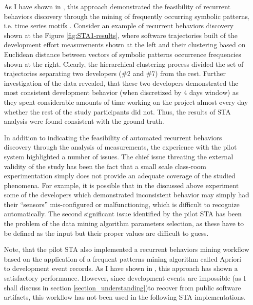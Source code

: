 As I have shown in \cite{csdl2-10-09}, this approach demonstrated the feasibility of recurrent behaviors discovery 
through the mining of frequently occurring symbolic patterns, i.e. time series motifs \cite{sax}. 
Consider an example of recurrent behaviors discovery shown at the Figure \ref{fig:STA1-results}, where software 
trajectories built of the development effort measurements shown at the left and their clustering based on Euclidean 
distance between vectors of symbolic patterns occurrence frequencies shown at the right. Clearly, the hierarchical clustering 
process divided the set of trajectories separating two developers (\#2 and \#7) from the rest. 
Further investigation of the data revealed, that these two developers demonstrated the most consistent development 
behavior (when discretized by 4 days window) as they spent considerable amounts of time working on the project almost every 
day whether the rest of the study participants did not. 
Thus, the results of STA analysis were found consistent with the ground truth.

In addition to indicating the feasibility of automated recurrent behaviors discovery through the analysis of measurements, 
the experience with the pilot system highlighted a number of issues.
The chief issue threating the external validity of the study has been the fact that a small scale class-room experimentation 
simply does not provide an adequate coverage of the studied phenomena. 
For example, it is possible that in the discussed above experiment some of the developers which demonstrated inconsistent 
behavior may simply had their ``sensors'' mis-configured or malfunctioning, which is difficult to recognize automatically.
The second significant issue identified by the pilot STA has been the problem of the data mining algorithm parameters 
selection, as these have to be defined as the input but their proper values are difficult to guess.

Note, that the pilot STA also implemented a recurrent behaviors mining workflow based on the application of 
a frequent patterns mining algorithm called Apriori \cite{citeulike:775528} to development event records. 
As I have shown in \cite{citeulike:13159603}, this approach has shown a satisfactory performance. 
However, since development events are impossible (as I shall discuss in section \ref{section_understanding})to recover from 
public software artifacts, this workflow has not been used in the following STA implementations.

